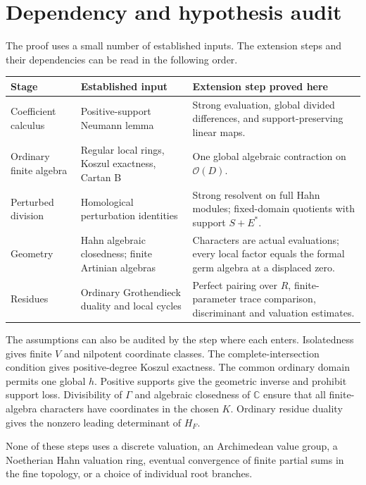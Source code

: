 \documentclass[11pt,letterpaper]{article}
\theoremstyle{definition}
\theoremstyle{remark}
\newcommand{\C}{\mathbb C}
\newcommand{\OO}{\mathcal O}
\numberwithin{equation}{section}
\begin{document}
\section{Dependency and hypothesis audit}\label{app:audit}
The proof uses a small number of established inputs. The extension steps and their dependencies can be read in the following order.
\begin{center}\small
\begin{tabular}{L{0.24\textwidth}L{0.32\textwidth}L{0.34\textwidth}}
\toprule
Stage & Established input & Extension step proved here\\
\midrule
Coefficient calculus & Positive-support Neumann lemma & Strong evaluation, global divided differences, and support-preserving linear maps.\\
Ordinary finite algebra & Regular local rings, Koszul exactness, Cartan B & One global algebraic contraction on $\OO(D)$.\\
Perturbed division & Homological perturbation identities & Strong resolvent on full Hahn modules; fixed-domain quotients with support $S+E^*$.\\
Geometry & Hahn algebraic closedness; finite Artinian algebras & Characters are actual evaluations; every local factor equals the formal germ algebra at a displaced zero.\\
Residues & Ordinary Grothendieck duality and local cycles & Perfect pairing over $R$, finite-parameter trace comparison, discriminant and valuation estimates.\\
\bottomrule
\end{tabular}
\end{center}

The assumptions can also be audited by the step where each enters. Isolatedness gives finite $V$ and nilpotent coordinate classes. The complete-intersection condition gives positive-degree Koszul exactness. The common ordinary domain permits one global $h$. Positive supports give the geometric inverse and prohibit support loss. Divisibility of $\Gamma$ and algebraic closedness of $\C$ ensure that all finite-algebra characters have coordinates in the chosen $K$. Ordinary residue duality gives the nonzero leading determinant of $H_F$.

None of these steps uses a discrete valuation, an Archimedean value group, a Noetherian Hahn valuation ring, eventual convergence of finite partial sums in the fine topology, or a choice of individual root branches.
\end{document}
